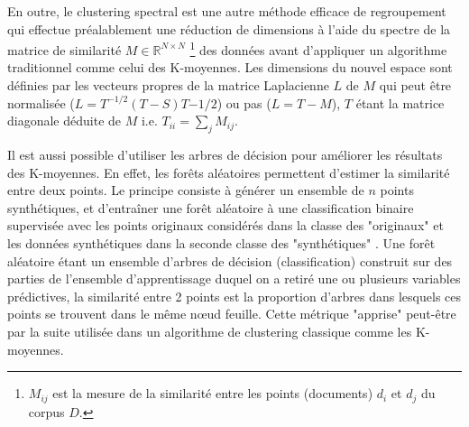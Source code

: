 En outre, le clustering spectral est une autre méthode efficace de regroupement qui effectue préalablement une réduction de dimensions à l'aide du spectre de la matrice de similarité $M \in \mathbb{R}^{N \times N}$ \footnote{$M_{ij}$ est la mesure de la similarité entre les points (documents) $d_i$ et $d_j$ du corpus $D$.} des données  avant d'appliquer un algorithme traditionnel comme celui des K-moyennes. Les dimensions du nouvel espace sont définies par les vecteurs propres de la matrice Laplacienne $L$ de $M$ \citep{shi2000spectralClustering, von2007tutorialSpectralClustering} qui peut être normalisée ($L = T^{-1/2}(T-S)T{-1/2}$) ou pas ($L = T - M$), $T$ étant la matrice diagonale déduite de $M$ i.e. $T_{ii} = \sum\limits_j M_{ij}$. 

Il est aussi possible d'utiliser les arbres de décision pour améliorer les résultats des K-moyennes. En effet, les forêts aléatoires \citep{breiman2001randomforest} permettent d'estimer la similarité entre deux points. Le principe consiste à générer un ensemble de $n$ points synthétiques, et d'entraîner une forêt aléatoire à une classification binaire supervisée avec les points originaux considérés dans la classe des "originaux" et les données synthétiques dans la seconde classe des "synthétiques" \citep{afanador2016unsupervisedrandomforest}. Une forêt aléatoire étant un ensemble d'arbres de décision (classification) construit sur des parties de l'ensemble d'apprentissage duquel on a retiré une ou plusieurs variables prédictives, la similarité entre 2 points est la proportion d'arbres dans lesquels ces points se trouvent dans le même nœud feuille. Cette métrique "apprise" peut-être par la suite utilisée dans un algorithme de clustering classique comme les K-moyennes.


